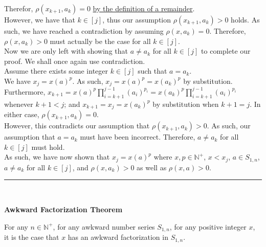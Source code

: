 \documentclass[a4paper,12pt]{article}
\begin{document}
\noindent Therefor,  $\rho(x_{k + 1}, a_k) = 0$ \hyperlink{theorem:remainder_function}{by the definition of a remainder}.\\ 

\noindent However, we have that $k \in [j]$, thus our assumption $\rho(x_{k + 1}, a_k) > 0$ holds. As such, we have reached a contradiction by assuming $\rho(x, a_k) = 0$. Therefore, $\rho(x, a_k) > 0$ must actually be the case for all $k \in [j]$.\\



\noindent Now we are only left with showing that $a \neq a_k$ for all $k \in [j]$ to complete our proof. We shall once again use contradiction.\\

\noindent Assume there exists some integer $k \in [j]$ such that $a = a_k$.\\

\noindent We have $x_j = x(a)^p$. As such, $x_j = x(a)^p = x(a_k)^p$ by substitution.\\

\noindent Furthermore, $\displaystyle x_{k + 1} = x(a)^p \prod_{i = k + 1}^{j - 1} (a_i)^{p_i} = x(a_k)^p \prod_{i = k + 1}^{j - 1} (a_i)^{p_i}$ whenever $k + 1 < j$; and $x_{k + 1} = x_j = x(a_k)^p$ by substitution when $k + 1 = j$. In either case, $\rho(x_{k + 1}, a_k) = 0$.\\

\noindent However, this contradicts our assumption that $\rho(x_{k + 1}, a_k) > 0$. As such, our assumption that $a = a_k$ must have been incorrect. Therefore, $a \neq a_k$ for all $k \in [j]$ must hold.\\

\noindent As such, we have now shown that $x_j = x(a)^p$ where $x, p \in \mathbb{N}^+$, $x < x_j$, $a \in S_{1, n}$, $a \neq a_k$ for all $k \in [j]$, and $\rho(x, a_k) > 0$ as well as $\rho(x, a) > 0$.

\begin{center}
\noindent\rule{8cm}{0.4pt}
\end{center}
\noindent \\









\label{thereom:awkward_factorization}
\hypertarget{thereom:awkward_factorization}{}
\begin{tcolorbox}
\textbf{Awkward Factorization Theorem}

For any $n \in \mathbb{N}^+$, for any awkward number series $S_{1,n}$, for any positive integer $x$, it is the case that $x$ has an awkward factorization in $S_{1, n}$.
\end{tcolorbox}
\end{document}
